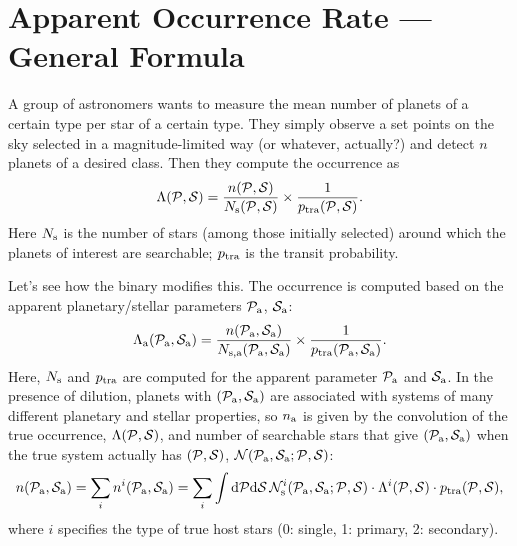 \documentclass[12pt,modern]{aastex61}
\begin{document}
\section{Apparent Occurrence Rate --- General Formula}

A group of astronomers wants to measure the mean number of planets of a 
certain type per star of a certain type.
They simply observe a set points on the sky selected in a magnitude-limited way (or whatever, actually?) and detect $n$ planets of a desired class. Then they compute the occurrence as
\begin{equation}
\Lambda(\pp, \ps) = \frac{n(\pp, \ps)}{N_{\rm s}(\pp, \ps)} \times \frac{1}{p_{\rm tra}(\pp, \ps)}.
\end{equation}
Here $N_{\rm s}$ is the number of stars (among those initially selected) around which the planets of interest are searchable; $p_{\rm tra}$ is the transit probability.

Let's see how the binary modifies this. The occurrence is computed based on the apparent planetary/stellar parameters $\mathcal{P}_{\rm a}$, $\mathcal{S}_{\rm a}$:
\begin{equation}
\Lambda\a(\pp\a, \ps\a) = \frac{n(\pp\a, \ps\a)}{N_{\rm s,a}(\pp\a, \ps\a)} \times \frac{1}{p_{\rm tra}(\pp\a, \ps\a)}.
\end{equation}
Here, $N_{\rm s}$ and $p_{\rm tra}$ are computed for the apparent parameter $\mathcal{P}_{\rm a}$ and $\mathcal{S}_{\rm a}$. In the presence of dilution, planets with $(\mathcal{P}_{\rm a}, \mathcal{S}_{\rm a})$ are associated with systems of many different planetary and stellar properties, so $n_{\rm a}$ is given by the convolution of the true occurrence, $\Lambda(\mathcal{P}, \mathcal{S})$, and number of searchable stars that give $(\mathcal{P}_{\rm a}, \mathcal{S}_{\rm a})$ when the true system actually has $(\mathcal{P}, \mathcal{S})$, $\mathcal{N}(\mathcal{P}_{\rm a}, \mathcal{S}_{\rm a}; \mathcal{P}, \mathcal{S})$:
\begin{equation}
	n(\pp\a, \ps\a)=\sum_i n^i(\pp\a, \ps\a)
	=\sum_i \int \mathrm{d}\pp\mathrm{d}\ps\,
	\mathcal{N}_{\rm s}^i(\pp\a,\ps\a; \pp, \ps)
	\cdot\Lambda^i(\pp, \ps)\cdot p_{\rm tra}(\pp, \ps),
\end{equation}
where $i$ specifies the type of true host stars (0: single, 1: primary, 2: secondary).
\end{document}
